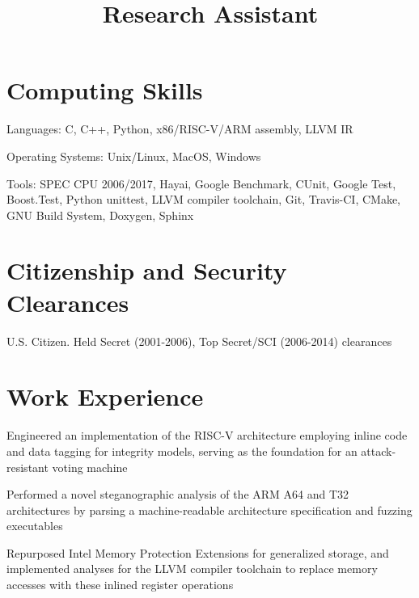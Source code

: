 \documentclass[line]{res}
\begin{document}
\begin{resume}
\section{Computing Skills}
\begin{list2}
\item Languages: C, C++, Python, x86/RISC-V/ARM assembly, LLVM IR
\item Operating Systems: Unix/Linux, MacOS, Windows
\item Tools: SPEC CPU 2006/2017, Hayai, Google Benchmark, CUnit, Google Test, Boost.Test, Python unittest, LLVM compiler toolchain, Git, Travis-CI, CMake, GNU Build System, Doxygen, Sphinx
\end{list2}

\section{Citizenship and Security Clearances}
U.S. Citizen. Held {\sc Secret} (2001-2006), {\sc Top Secret/SCI} (2006-2014) clearances

\section{Work Experience}

\title{{\bf Research Assistant}}
\begin{position}
\vspace*{-.2cm}
\begin{list2}
	\item Engineered an implementation of the RISC-V architecture employing inline code and data tagging for integrity models, serving as the foundation for an attack-resistant voting machine
	\item Performed a novel steganographic analysis of the ARM A64 and T32 architectures by parsing a machine-readable architecture specification and fuzzing executables
	\item Repurposed Intel Memory Protection Extensions for generalized storage, and implemented analyses for the LLVM compiler toolchain to replace memory accesses with these inlined register operations
\end{list2}
\end{position}


\end{resume}
\end{document}
